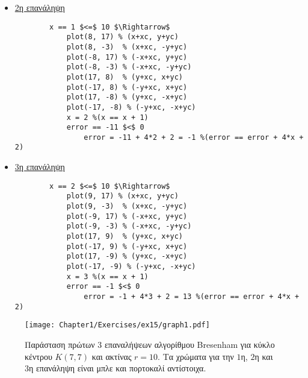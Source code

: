 \begin{solution}
\begin{itemize}
  \item \underline{2η επανάληψη}

		\begin{lstlisting}
		x == 1 $<=$ 10 $\Rightarrow$
			plot(8, 17) % (x+xc, y+yc)
			plot(8, -3)  % (x+xc, -y+yc)
			plot(-8, 17) % (-x+xc, y+yc)
			plot(-8, -3) % (-x+xc, -y+yc)
			plot(17, 8)  % (y+xc, x+yc)
			plot(-17, 8) % (-y+xc, x+yc)
			plot(17, -8) % (y+xc, -x+yc)
			plot(-17, -8) % (-y+xc, -x+yc)
			x = 2 %(x == x + 1)
			error == -11 $<$ 0 
				error = -11 + 4*2 + 2 = -1 %(error == error + 4*x + 2)
		\end{lstlisting}

  \item \underline{3η επανάληψη}

		\begin{lstlisting}
		x == 2 $<=$ 10 $\Rightarrow$
			plot(9, 17) % (x+xc, y+yc)
			plot(9, -3)  % (x+xc, -y+yc)
			plot(-9, 17) % (-x+xc, y+yc)
			plot(-9, -3) % (-x+xc, -y+yc)
			plot(17, 9)  % (y+xc, x+yc)
			plot(-17, 9) % (-y+xc, x+yc)
			plot(17, -9) % (y+xc, -x+yc)
			plot(-17, -9) % (-y+xc, -x+yc)
			x = 3 %(x == x + 1)
			error == -1 $<$ 0 
				error = -1 + 4*3 + 2 = 13 %(error == error + 4*x + 2)
		\end{lstlisting}
\end{itemize}

\begin{figure}[hbt]
  \begin{center}
	\texttt{[image: Chapter1/Exercises/ex15/graph1.pdf]}
  \end{center}
  \caption{Παράσταση πρώτων $3$ επαναλήψεων αλγορίθμου Bresenham για κύκλο κέντρου $Κ(7,7)$ και ακτίνας $r = 10$. Τα χρώματα για την $1$η, $2$η και $3$η επανάληψη είναι μπλε και πορτοκαλί αντίστοιχα. }
\end{figure}

\end{solution}